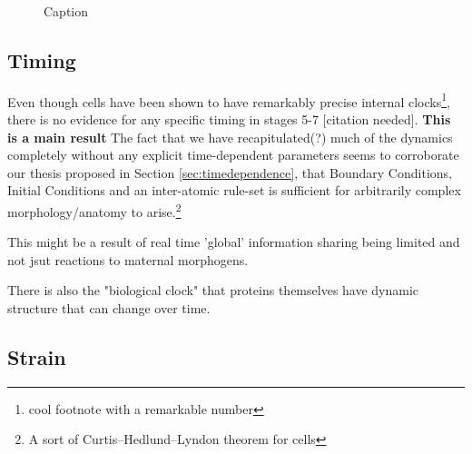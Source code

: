 \begin{figure}[H]
    \centering
    \caption{Caption}
    \label{fig:enter-label}
\end{figure}

\subsection{Timing}
Even though cells have been shown to have remarkably precise internal clocks\footnote{cool footnote with a remarkable number}\cite{}, there is no evidence for any specific timing in stages 5-7 [citation needed].\textbf{ This is a main result} The fact that we have recapitulated(?) much of the dynamics completely without any explicit time-dependent parameters seems to corroborate our thesis proposed in Section \ref{sec:timedependence}, that Boundary Conditions, Initial Conditions and an inter-atomic rule-set is sufficient for arbitrarily complex morphology/anatomy to arise.\footnote{A sort of Curtis–Hedlund–Lyndon theorem for cells}    

This might be a result of real time 'global' information sharing being limited and not jsut reactions to maternal morphogens.

There is also the "biological clock"\cite{johanolsen2} that proteins themselves have dynamic structure that can change over time.\cite{johanolsen1}
\subsection{Strain}

